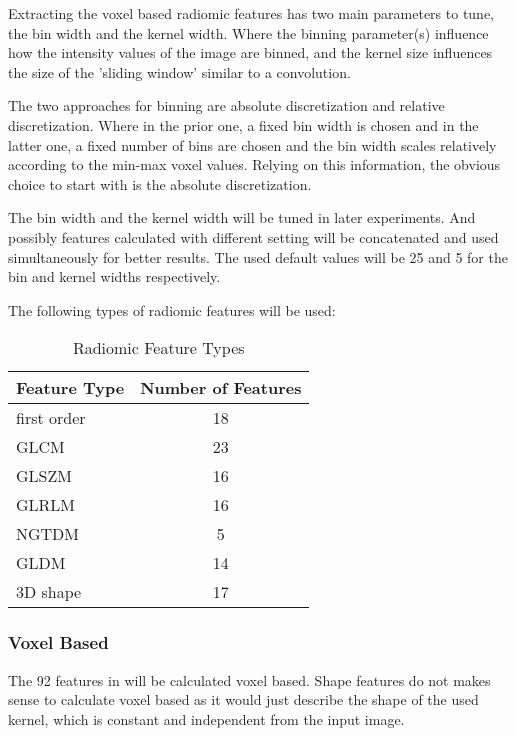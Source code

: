 Extracting the voxel based radiomic features has two main parameters to tune, the bin width and the kernel width. Where the binning parameter(s) influence how the intensity values of the image are binned, and the kernel size influences the size of the 'sliding window' similar to a convolution.\par

The two approaches for binning are absolute discretization and relative discretization. Where in the prior one, a fixed bin width is chosen and in the latter one, a fixed number of bins are chosen and the bin width scales relatively according to the min-max voxel values.  Relying on this information, the obvious choice to start with is the absolute discretization.\par
The bin width and the kernel width will be tuned in later experiments. And possibly features calculated with different setting will be concatenated and used simultaneously for better results. The used default values will be 25 and 5 for the bin and kernel widths respectively.\par
The following types of radiomic features will be used:
\begin{table}[H]
\centering
\begin{tabular}{|l|c|}
\hline
\textbf{Feature Type} & \textbf{Number of Features} \\ \hline
first order & 18 \\ \hline
\ac{GLCM} & 23 \\ \hline
\ac{GLSZM} & 16 \\ \hline
\ac{GLRLM} & 16 \\ \hline
\ac{NGTDM} & 5 \\ \hline
\ac{GLDM} & 14 \\ \hline
3D shape & 17 \\ \hline
\end{tabular}
\caption{Radiomic Feature Types}
\label{tab:radf0}
\end{table}

\subsubsection{Voxel Based}
The 92 features in  will be calculated voxel based. Shape features do not makes sense to calculate voxel based as it would just describe the shape of the used kernel, which is constant and independent from the input image.


